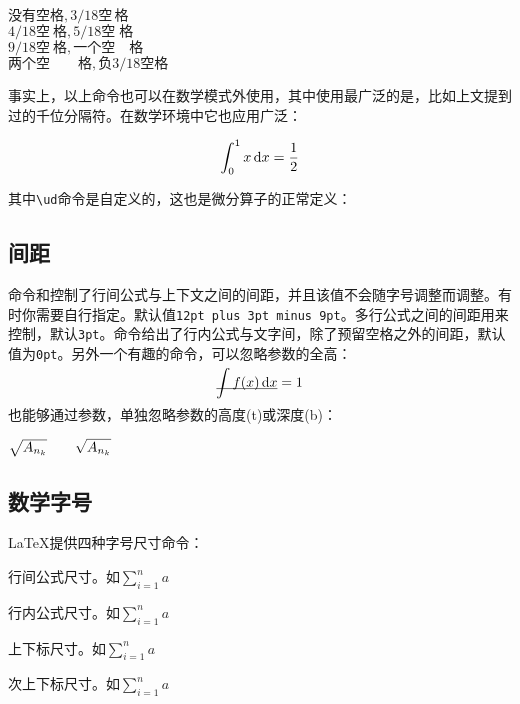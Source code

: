 \begin{codeshow}
  $没有空格,3/18空\,格$ \\
  $4/18空\:格,5/18空\;格$ \\
  $9/18空\ 格,一个空\quad 格$ \\
  $两个空\qquad 格,负3/18空\!格$
\end{codeshow}

事实上，以上命令也可以在数学模式外使用，其中使用最广泛的是\latexline{,}，比如上文提到过的千位分隔符。在数学环境中它也应用广泛：

\begin{codeshow}
\[ \int_0^1 x \ud{}x
= \frac{1}{2} \]
\end{codeshow}

其中\verb|\ud|命令是自定义的，这也是微分算子的正常定义\label{cmd:ud}：
\begin{latex}
\newcommand{\ud}{\mathop{}\negthinspace\mathrm{d}}
\end{latex}

\subsection{间距}
命令和控制了行间公式与上下文之间的间距，并且该值不会随字号调整而调整。有时你需要自行指定。默认值\texttt{12pt plus 3pt minus 9pt}。多行公式之间的间距用来控制，默认\texttt{3pt}。命令给出了行内公式与文字间，除了预留空格之外的间距，默认值为\texttt{0pt}。另外一个有趣的命令，可以忽略参数的全高：
\begin{codeshow}
\[\underline{\smash{\int f(x)\ud x}}=1\]
\end{codeshow}

也能够通过参数，单独忽略参数的高度(t)或深度(b)：
\begin{codeshow}
$\sqrt{A_{n_k}} \qquad
\sqrt{\smash[b]{A_{n_k}}}$
\end{codeshow}

\subsection{数学字号}
\LaTeX{}提供四种字号尺寸命令：
\begin{para}
\item[\latexline{displaystyle}] 行间公式尺寸。如$\displaystyle \sum_{i=1}^n a$
\item[\latexline{textstyle}] 行内公式尺寸。如$\textstyle \sum_{i=1}^n a$
\item[\latexline{scriptstyle}] 上下标尺寸。如$\scriptstyle \sum_{i=1}^n a$
\item[\latexline{scriptscriptstyle}] 次上下标尺寸。如$\scriptscriptstyle \sum_{i=1}^n a$
\end{para}

